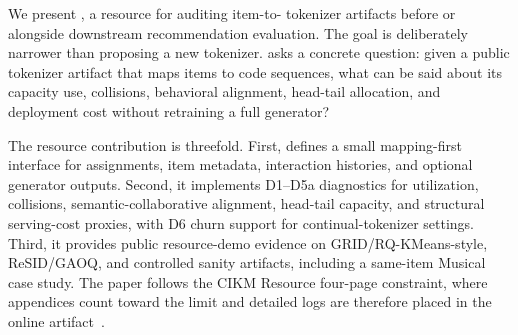 We present \tool, a resource for auditing item-to-\sid{} tokenizer artifacts
before or alongside downstream recommendation evaluation. The goal is
deliberately narrower than proposing a new tokenizer. \tool asks a concrete
question: given a public tokenizer artifact that maps items to code sequences,
what can be said about its capacity use, collisions, behavioral alignment,
head-tail allocation, and deployment cost without retraining a full generator?

The resource contribution is threefold. First, \tool defines a small
mapping-first interface for \sid assignments, item metadata, interaction
histories, and optional generator outputs. Second, it implements D1--D5a
diagnostics for utilization, collisions, semantic-collaborative alignment,
head-tail capacity, and structural serving-cost proxies, with D6 churn support
for continual-tokenizer settings. Third, it provides public resource-demo
evidence on GRID/RQ-KMeans-style, ReSID/GAOQ, and controlled sanity artifacts,
including a same-item Musical case study. The paper follows the CIKM Resource
four-page constraint, where appendices count toward the limit and detailed
logs are therefore placed in the online artifact~\cite{cikm2026resource}.
